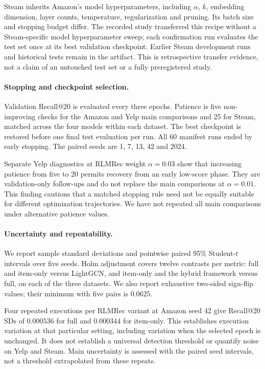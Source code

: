 \documentclass[runningheads]{llncs}
\begin{document}
Steam inherits Amazon's model hyperparameters, including $\alpha$, $k$,
embedding dimension, layer counts, temperature, regularization and pruning.
Its batch size and stopping budget differ. The recorded study transferred
this recipe without a Steam-specific model hyperparameter sweep; each
confirmation run evaluates the test set once at its best validation checkpoint.
Earlier Steam development runs and historical tests remain in the artifact.
This is retrospective transfer evidence, not a claim of an untouched test set
or a fully preregistered study.

\paragraph{Stopping and checkpoint selection.}
Validation Recall@20 is evaluated every three epochs. Patience is five
non-improving checks for the Amazon and Yelp main comparisons and 25 for
Steam, matched across the four models within each dataset. The best checkpoint
is restored before one final test evaluation per run. All 60 manifest runs
ended by early stopping. The paired seeds are 1, 7, 13, 42 and 2024.

Separate Yelp diagnostics at RLMRec weight $\alpha=0.03$ show that increasing
patience from five to 20 permits recovery from an early low-score phase.
They are validation-only follow-ups and do not replace the main comparisons
at $\alpha=0.01$. This finding cautions that a matched stopping rule need not
be equally suitable for different optimization trajectories. We have not
repeated all main comparisons under alternative patience values.

\paragraph{Uncertainty and repeatability.}
We report sample standard deviations and pointwise paired 95\% Student-$t$
intervals over five seeds. Holm adjustment covers twelve contrasts per
metric: full and item-only versus LightGCN, and item-only and the hybrid framework
versus full, on each of the three datasets. We also report exhaustive two-sided
sign-flip values; their minimum with five pairs is $0.0625$.

Four repeated executions per RLMRec variant at Amazon seed 42 give Recall@20
SDs of $0.000536$ for full and $0.000344$ for item-only. This establishes
execution variation at that particular setting, including variation when the
selected epoch is unchanged. It does not establish a universal detection
threshold or quantify noise on Yelp and Steam. Main uncertainty is assessed
with the paired seed intervals, not a threshold extrapolated from these repeats.
\end{document}
